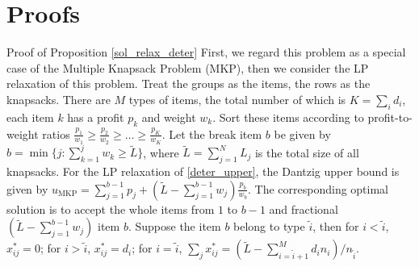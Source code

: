 \clearpage
\section{Proofs}

\begin{pf}{Proof of Proposition \ref{sol_relax_deter}}
  First, we regard this problem as a special case of the Multiple Knapsack Problem (MKP), then we consider the LP relaxation of this problem.
  Treat the groups as the items, the rows as the knapsacks. There are $M$ types of items, the total number of which is $K = \sum_{i} d_i$, each item $k$ has a profit $p_k$ and weight $w_k$. 
  Sort these items according to profit-to-weight ratios $\frac{p_1}{w_1} \geq \frac{p_2}{w_2} \geq \ldots \geq \frac{p_K}{w_K}$. Let the break item $b$ be given by $b=\min \{j: \sum_{k=1}^j w_k \geq \tilde{L}\}$, where $\tilde{L} = \sum_{j=1}^{N} L_j$ is the total size of all knapsacks. 
  For the LP relaxation of \eqref{deter_upper}, the Dantzig upper bound \cite{dantzig1957discrete} is given by $u_{\mathrm{MKP}}=\sum_{j=1}^{b-1} p_j+\left(\tilde{L}-\sum_{j=1}^{b-1} w_j\right) \frac{p_b}{w_b}$. The corresponding optimal solution is to accept the whole items from $1$ to $b-1$ and fractional $(\tilde{L}-\sum_{j=1}^{b-1} w_j)$ item $b$. Suppose the item $b$ belong to type $\tilde{i}$, then for $i < \tilde{i}$, $x_{ij}^{*} = 0$; for $i > \tilde{i}$, $x_{ij}^{*} = d_{i}$; for $i = \tilde{i}$, $\sum_{j} x_{ij}^{*} = (\tilde{L} - \sum_{i = \tilde{i}+1}^{M} {d_i n_i})/ n_{\tilde{i}}$.
\end{pf}


